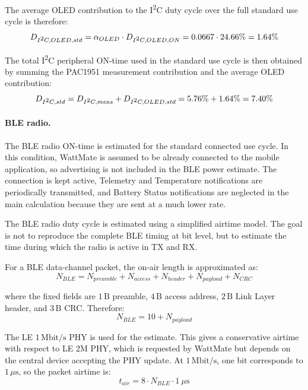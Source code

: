 The average OLED contribution to the I\textsuperscript{2}C duty cycle over the full standard use cycle is therefore:
\begin{equation}
	D_{I\textsuperscript{2}C,OLED,std}	= \alpha_{OLED} \cdot D_{I\textsuperscript{2}C,OLED,ON}
	= 0.0667 \cdot 24.66\%
	= 1.64\%
\end{equation}

The total I\textsuperscript{2}C peripheral ON-time used in the standard use cycle is then obtained by summing the PAC1951 measurement contribution and the average OLED contribution:
\begin{equation}
	D_{I\textsuperscript{2}C,std}	= D_{I\textsuperscript{2}C,meas} + D_{I\textsuperscript{2}C,OLED,std}
	= 5.76\% + 1.64\%
	= 7.40\%
\end{equation}

\paragraph{BLE radio.}
The BLE radio ON-time is estimated for the standard connected use cycle. 
In this condition, WattMate is assumed to be already connected to the mobile application, so advertising is not included in the BLE power estimate. 
The connection is kept active, Telemetry and Temperature notifications are periodically transmitted, and Battery Status notifications are neglected in the main calculation because they are sent at a much lower rate.

The BLE radio duty cycle is estimated using a simplified airtime model. 
The goal is not to reproduce the complete BLE timing at bit level, but to estimate the time during which the radio is active in TX and RX.

For a BLE data-channel packet, the on-air length is approximated as:
\begin{equation}
	N_{BLE} = N_{preamble} + N_{access} + N_{header} + N_{payload} + N_{CRC}
\end{equation}

where the fixed fields are \(1\,\mathrm{B}\) preamble, \(4\,\mathrm{B}\) access address, \(2\,\mathrm{B}\) Link Layer header, and \(3\,\mathrm{B}\) CRC. 
Therefore:
\begin{equation}
	N_{BLE} = 10 + N_{payload}
\end{equation}

The LE \(1\,\mathrm{Mbit/s}\) PHY is used for the estimate. 
This gives a conservative airtime with respect to LE 2M PHY, which is requested by WattMate but depends on the central device accepting the PHY update. 
At \(1\,\mathrm{Mbit/s}\), one bit corresponds to \(1\,\mu\mathrm{s}\), so the packet airtime is:
\begin{equation}
	t_{air} = 8 \cdot N_{BLE} \cdot 1 \ \mu\mathrm{s}
\end{equation}

